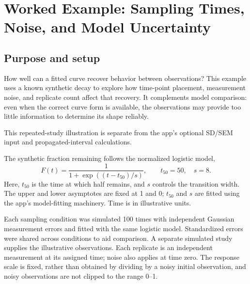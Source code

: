 %
%   
%  


\section{Worked Example: Sampling Times, Noise, and Model Uncertainty}
\label{sec:sampling-design-tutorial}

\subsection{Purpose and setup}

How well can a fitted curve recover behavior between observations? This example
uses a known synthetic decay to explore how time-point placement, measurement
noise, and replicate count affect that recovery. It complements model comparison:
even when the correct curve form is available, the observations may provide too
little information to determine its shape reliably.

This repeated-study illustration is separate from the app's optional SD/SEM input and propagated-interval calculations.

The synthetic fraction remaining follows the normalized logistic model,
\[
  F(t)=\frac{1}{1+\exp\!\left((t-t_{50})/s\right)},
  \qquad t_{50}=50,\quad s=8.
\]
Here, $t_{50}$ is the time at which half remains, and $s$ controls the transition
width. The upper and lower asymptotes are fixed at 1 and 0; $t_{50}$ and $s$ are
fitted using the app's model-fitting machinery. Time is in illustrative units.

Each sampling condition was simulated 100 times with independent Gaussian
measurement errors and fitted with the same logistic model. Standardized errors
were shared across conditions to aid comparison. A separate simulated
study supplies the illustrative observations. Each replicate is an independent
measurement at its assigned time; noise also applies at time zero. The response
scale is fixed, rather than obtained by dividing by a noisy initial observation,
and noisy observations are not clipped to the range 0--1.


